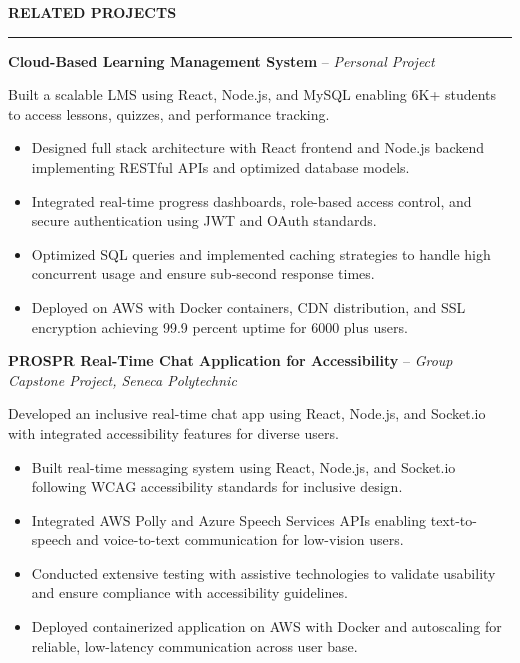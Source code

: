 \documentclass[10pt,letterpaper]{article}
\begin{document}
\vspace{6pt}

\textbf{RELATED PROJECTS}\\[-8pt]
\noindent\rule{\textwidth}{1pt}

\vspace{-2pt}

\textbf{Cloud-Based Learning Management System} -- \emph{Personal Project}

\vspace{-1pt}

Built a scalable LMS using React, Node.js, and MySQL enabling 6K+ students to access lessons, quizzes, and performance tracking.
\vspace{-1pt}
\begin{itemize}
\item Designed full stack architecture with React frontend and Node.js backend implementing RESTful APIs and optimized database models.
\item Integrated real-time progress dashboards, role-based access control, and secure authentication using JWT and OAuth standards.
\item Optimized SQL queries and implemented caching strategies to handle high concurrent usage and ensure sub-second response times.
\item Deployed on AWS with Docker containers, CDN distribution, and SSL encryption achieving 99.9 percent uptime for 6000 plus users.
\end{itemize}

\textbf{PROSPR  Real-Time Chat Application for Accessibility} -- \emph{Group Capstone Project, Seneca Polytechnic}

\vspace{-1pt}

Developed an inclusive real-time chat app using React, Node.js, and Socket.io with integrated accessibility features for diverse users.
\vspace{-1pt}
\begin{itemize}
\item Built real-time messaging system using React, Node.js, and Socket.io following WCAG accessibility standards for inclusive design.
\item Integrated AWS Polly and Azure Speech Services APIs enabling text-to-speech and voice-to-text communication for low-vision users.
\item Conducted extensive testing with assistive technologies to validate usability and ensure compliance with accessibility guidelines.
\item Deployed containerized application on AWS with Docker and autoscaling for reliable, low-latency communication across user base.
\end{itemize}
\end{document}
